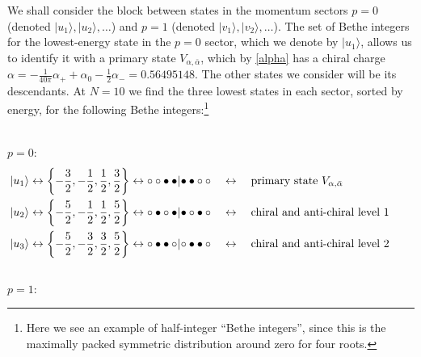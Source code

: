 \documentclass[a4paper,10pt]{article}
\begin{document}
We shall consider the block between states in the momentum sectors $p=0$ (denoted $|u_1\rangle, |u_2\rangle, \hdots$) and $p=1$ (denoted $|v_1\rangle, |v_2\rangle, \hdots$). The set of Bethe integers for the lowest-energy state in the $p=0$ sector, which we denote by $|u_1\rangle$, allows us to identify it with a primary state $V_{\alpha,\bar{\alpha}}$, which by \eqref{alpha}
has a chiral charge $\alpha =   -\frac{1}{40 \pi} \alpha_{+}  + \alpha_0 - \frac{1}{2} \alpha_{-}  = 0.56495148 $. 
The other states we consider will be its descendants. At $N=10$ we find the three lowest states in each sector, sorted by energy, for the following Bethe integers:\footnote{Here we see an example of half-integer ``Bethe integers'', since this is the maximally packed symmetric distribution around zero for four roots.}

~\\
$p=0$: 
\begin{equation}\label{p0states}
\begin{split}
| u_1\rangle \leftrightarrow\left\{-\frac{3}{2},-\frac{1}{2},\frac{1}{2},\frac{3}{2}\right\}& \leftrightarrow\circ\circ\bullet\bullet \hspace*{-2pt}|\hspace*{-2pt} \bullet\bullet\circ\circ \quad\leftrightarrow\quad \text{primary state }V_{\alpha,\bar{\alpha}}\\
| u_2\rangle \leftrightarrow \left\{-\frac{5}{2},-\frac{1}{2},\frac{1}{2},\frac{5}{2}\right\}& \leftrightarrow\circ\bullet\circ\bullet\hspace*{-2pt}|\hspace*{-2pt}\bullet\circ\bullet\circ  \quad\leftrightarrow\quad \text{chiral and anti-chiral level 1}\\
| u_3 \rangle \leftrightarrow\left\{-\frac{5}{2},-\frac{3}{2},\frac{3}{2},\frac{5}{2}\right\}& \leftrightarrow\circ\bullet\bullet\circ\hspace*{-2pt}|\hspace*{-2pt}\circ\bullet\bullet\circ  \quad\leftrightarrow\quad \text{chiral and anti-chiral level 2}\hspace*{19pt}
\end{split}
\end{equation}
~\\
$p=1$:
\end{document}
